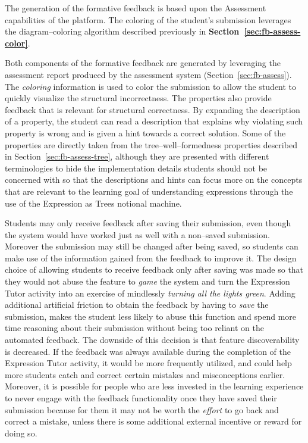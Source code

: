 \begin{chapterBody}
The generation of the formative feedback is based upon the Assessment
capabilities of the platform. The coloring of the student's submission
leverages the diagram–coloring algorithm described previously in
\textbf{Section~\ref{sec:fb-assess-color}}.

Both components of the formative feedback are generated by leveraging
the assessment report produced by the assessment system
(Section~\ref{sec:fb-assess}). The \textit{coloring} information is
used to color the submission to allow the student to quickly visualize
the structural incorrectness. The properties also provide feedback that is
relevant for structural correctness. By expanding the description of a
property, the student can read a description that explains why violating
such property is wrong and is given a hint towards a correct solution.
Some of the properties are directly taken from the tree–well–formedness
properties described in Section~\ref{sec:fb-assess-tree}, although they
are presented with different terminologies to hide the implementation
details students should not be concerned with so that the descriptions
and hints can focus more on the concepts that are relevant to the
learning goal of understanding expressions through the use of the
Expression as Trees notional machine.

Students may only receive feedback after saving their submission, even
though the system would have worked just as well with a non–saved
submission. Moreover the submission may still be changed after being
saved, so students can make use of the information gained from the feedback
to improve it.
The design choice of allowing students to receive feedback only after
saving was made so that they would not abuse the feature to \textit{game}
the system and turn the Expression Tutor activity into an exercise of
mindlessly \textit{turning all the lights green}. Adding additional
artificial friction to obtain the feedback by having to \textit{save}
the submission, makes the student less likely to abuse this function and
spend more time reasoning about their submission without being too reliant
on the automated feedback. The downside of this decision is that feature
discoverability is decreased. If the feedback was always available during
the completion of the Expression Tutor activity, it would be more frequently
utilized, and could help more students catch and correct certain mistakes
and misconceptions earlier. Moreover, it is possible for people who are
less invested in the learning experience to never engage with the
feedback functionality once they have saved their submission because for
them it may not be worth the \textit{effort} to go back and correct a
mistake, unless there is some additional external incentive or
reward for doing so.


\end{chapterBody}
